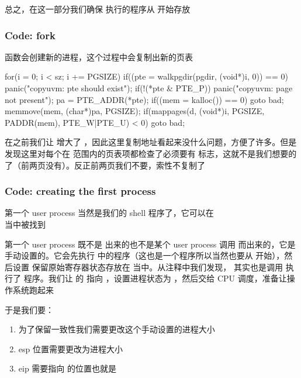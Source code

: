 总之，在这一部分我们确保  执行的程序从  开始存放

\subsubsection{Code: fork}

 函数会创建新的进程，这个过程中会复制出新的页表


\begin{ccode}
    for(i = 0; i < sz; i += PGSIZE){
        if((pte = walkpgdir(pgdir, (void*)i, 0)) == 0)
        panic("copyuvm: pte should exist");
        if(!(*pte & PTE_P))
        panic("copyuvm: page not present");
        pa = PTE_ADDR(*pte);
        if((mem = kalloc()) == 0)
        goto bad;
        memmove(mem, (char*)pa, PGSIZE);
        if(mappages(d, (void*)i, PGSIZE, PADDR(mem), PTE_W|PTE_U) < 0)
        goto bad;
    }
\end{ccode}

在之前我们让  增大了 ，因此这里复制地址看起来没什么问题，方便了许多。但是发现这里对每个在  范围内的页表项都检查了必须要有  标志，这就不是我们想要的了（前两页没有）。反正前两页我们不要，索性不复制了

\begin{ccode}
    // for(i = 0; i < sz; i += PGSIZE){
    for (i=0x2000; i<sz; i += PGSIZE){
\end{ccode}

\subsubsection{Code: creating the first process}

第一个 user process 当然是我们的 shell 程序了，它可以在 \\
 当中被找到

第一个 user process 既不是  出来的也不是某个 user process 调用  而出来的，它是手动设置的。它会先执行  中的程序（这也是一个程序所以当然也要从 开始），然后设置  保留原始寄存器状态存放在  当中。从注释中我们发现， 其实也是调用  执行了  程序。我们让  的  指向 ，设置进程状态为 ，然后交给 CPU 调度，准备让操作系统跑起来

于是我们要：

\begin{enumerate}
    \item 为了保留一致性我们需要更改这个手动设置的进程大小
    \item esp 位置需要更改为进程大小
    \item eip 需要指向  的位置也就是 
\end{enumerate}

